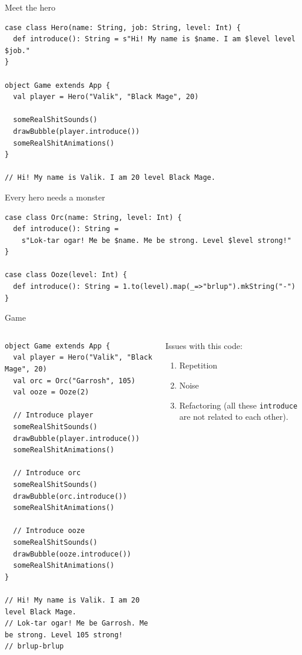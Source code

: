 \documentclass[presentation,aspectratio=169,smaller]{beamer}
\begin{document}
\begin{frame}[label={sec:org548a4a2},fragile]{Meet the hero}
 \begin{verbatim}
case class Hero(name: String, job: String, level: Int) {
  def introduce(): String = s"Hi! My name is $name. I am $level level $job."
}

object Game extends App {
  val player = Hero("Valik", "Black Mage", 20)

  someRealShitSounds()
  drawBubble(player.introduce())
  someRealShitAnimations()
}

// Hi! My name is Valik. I am 20 level Black Mage.
\end{verbatim}
\end{frame}

\begin{frame}[label={sec:org37b8864},fragile]{Every hero needs a monster}
 \begin{verbatim}
case class Orc(name: String, level: Int) {
  def introduce(): String =
    s"Lok-tar ogar! Me be $name. Me be strong. Level $level strong!"
}

case class Ooze(level: Int) {
  def introduce(): String = 1.to(level).map(_=>"brlup").mkString("-")
}
\end{verbatim}
\end{frame}

\begin{frame}[label={sec:org042f58d},fragile]{Game}
 \begin{columns}
\begin{column}[t]{0.46\columnwidth}
\begin{verbatim}
object Game extends App {
  val player = Hero("Valik", "Black Mage", 20)
  val orc = Orc("Garrosh", 105)
  val ooze = Ooze(2)

  // Introduce player
  someRealShitSounds()
  drawBubble(player.introduce())
  someRealShitAnimations()

  // Introduce orc
  someRealShitSounds()
  drawBubble(orc.introduce())
  someRealShitAnimations()

  // Introduce ooze
  someRealShitSounds()
  drawBubble(ooze.introduce())
  someRealShitAnimations()
}

// Hi! My name is Valik. I am 20 level Black Mage.
// Lok-tar ogar! Me be Garrosh. Me be strong. Level 105 strong!
// brlup-brlup
\end{verbatim}

\pause
\end{column}

\begin{column}[t]{0.46\columnwidth}
\vspace*{0px}

Issues with this code:

\begin{enumerate}
\item Repetition
\item Noise
\item Refactoring (all these \texttt{introduce} are not related to each other).
\end{enumerate}
\end{column}
\end{columns}
\end{frame}
\end{document}
